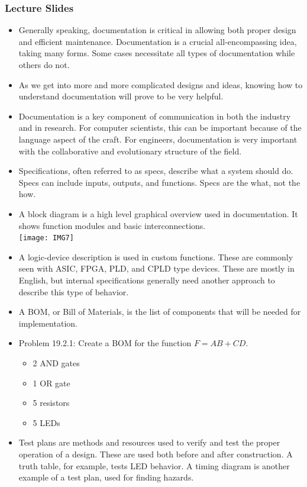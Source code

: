 \documentclass[10pt,a4paper]{article}
\begin{document}
\subsubsection{Lecture Slides}
\begin{itemize}
\item Generally speaking, documentation is critical in allowing both proper design and efficient maintenance. Documentation is a crucial all-encompassing idea, taking many forms. Some cases necessitate all types of documentation while others do not.
\item As we get into more and more complicated designs and ideas, knowing how to understand documentation will prove to be very helpful.
\item Documentation is a key component of communication in both the industry and in research. For computer scientists, this can be important because of the language aspect of the craft. For engineers, documentation is very important with the collaborative and evolutionary structure of the field.
\item Specifications, often referred to as specs, describe what a system should do. Specs can include inputs, outputs, and functions. Specs are the what, not the how. 
\item A block diagram is a high level graphical overview used in documentation. It shows function modules and basic interconnections.\\
\texttt{[image: IMG7]}
\item A logic-device description is used in custom functions. These are commonly seen with ASIC, FPGA, PLD, and CPLD type devices. These are mostly in English, but internal specifications generally need another approach to describe this type of behavior. 
\item A BOM, or Bill of Materials, is the list of components that will be needed for implementation.
\item Problem 19.2.1: Create a BOM for the function $F=AB+CD$.\\
\begin{itemize}
\item 2 AND gates
\item 1 OR gate
\item 5 resistors
\item 5 LEDs
\end{itemize}
\item Test plans are methods and resources used to verify and test the proper operation of a design. These are used both before and after construction. A truth table, for example, tests LED behavior. A timing diagram is another example of a test plan, used for finding hazards.

\end{itemize}
\end{document}

